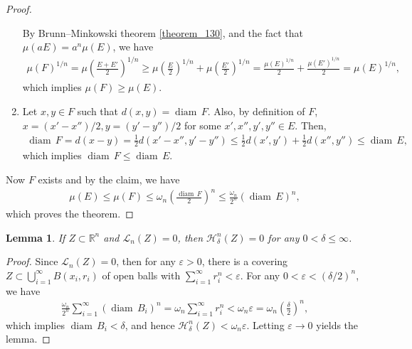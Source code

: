 \documentclass[11pt]{book}
\newtheorem{lemma}{Lemma}[chapter]
\theoremstyle{definition}
\numberwithin{equation}{chapter}
\def\H{{\mathcal H}}
\def\L{{\mathcal L}}
\def\diam{{\operatorname{diam}\,}}
\begin{document}
\begin{proof}
\begin{enumerate}[label=(\alph*)]
    By Brunn–Minkowski theorem \ref{theorem_130}, and the fact that $\mu(aE) = a^n \mu(E)$, we have
    \begin{align*}
        \mu(F)^{1/n} = \mu\left(\frac{E+E'}{2}\right)^{1/n} \geq \mu\left(\frac{E}{2}\right)^{1/n} + \mu\left(\frac{E'}{2}\right)^{1/n} = \frac{\mu(E)^{1/n}}{2} + \frac{\mu(E')^{1/n}}{2} = \mu(E)^{1/n},
    \end{align*}
    which implies $\mu(F) \geq \mu(E)$.
    
    \item Let $x,y \in F$ such that $d(x,y) = \diam F$. Also, by definition of $F$, $x = (x' - x'')/2, y = (y' - y'')/2$ for some $x',x'',y',y'' \in E$. Then,
    \begin{align*}
        \diam F = d(x - y) = \frac{1}{2} d(x'-x'',y'-y'') \leq \frac{1}{2} d(x',y') + \frac{1}{2} d(x'',y'') \leq \diam E,
    \end{align*}
    which implies $\diam F \leq \diam E$.
\end{enumerate}

Now $F$ exists and by the claim, we have
\begin{align*}
    \mu(E) \leq \mu(F) \leq \omega_n \left(\frac{\diam F}{2}\right)^n \leq \frac{\omega_n}{2^n} (\diam E)^n,
\end{align*}
which proves the theorem.
\end{proof}

\medskip

\begin{lemma}\label{lemma_12}
If $Z \subset \mathbb{R}^n$ and $\L_n(Z) = 0$, then $\H^n_{\delta}(Z) = 0$ for any $0 < \delta \leq \infty$.
\end{lemma}
\begin{proof}
Since $\L_n(Z) = 0$, then for any $\varepsilon > 0$, there is a covering $Z \subset \bigcup^\infty_{i=1} B(x_i,r_i)$ of open balls with $\sum^\infty_{i=1} r_i^n < \varepsilon$. For any $0 < \varepsilon < (\delta/2)^n$, we have
\begin{align*}
    \frac{\omega_n}{2^n} \sum^\infty_{i=1}(\diam B_i)^n = \omega_n \sum^\infty_{i=1} r_i^n < \omega_n \varepsilon = \omega_n \left(\frac{\delta}{2}\right)^n,
\end{align*}
which implies $\diam B_i < \delta$, and hence $\H^n_{\delta}(Z) < \omega_n \varepsilon$. Letting $\varepsilon \to 0$ yields the lemma.
\end{proof}
\end{document}
